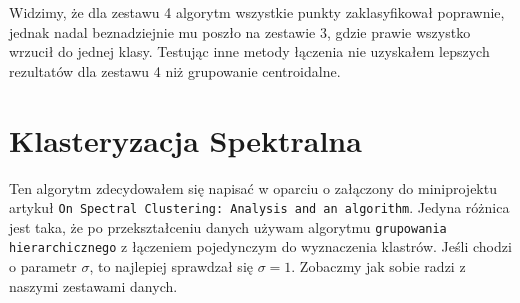 \documentclass[polish,12pt,a4paper]{extarticle}
\begin{document}
\noindent Widzimy, że dla zestawu 4 algorytm wszystkie punkty zaklasyfikował poprawnie, jednak nadal beznadziejnie mu poszło na zestawie 3, gdzie prawie wszystko wrzucił do jednej klasy. Testując inne metody łączenia nie uzyskałem lepszych rezultatów dla zestawu 4 niż grupowanie centroidalne.

\section*{Klasteryzacja Spektralna}
Ten algorytm zdecydowałem się napisać w oparciu o załączony do miniprojektu artykuł \texttt{On Spectral Clustering: Analysis and an algorithm}. Jedyna różnica jest taka, że po przekształceniu danych używam algorytmu \texttt{grupowania hierarchicznego} z łączeniem pojedynczym do wyznaczenia klastrów. Jeśli chodzi o parametr $\sigma$, to najlepiej sprawdzał się $\sigma = 1$. Zobaczmy jak sobie radzi z naszymi zestawami danych.
\end{document}
